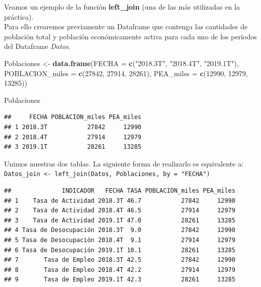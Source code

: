 \documentclass[]{book}
\newenvironment{Shaded}{\begin{snugshade}}{\end{snugshade}}
\newcommand{\DataTypeTok}[1]{\textcolor[rgb]{0.13,0.29,0.53}{#1}}
\newcommand{\DecValTok}[1]{\textcolor[rgb]{0.00,0.00,0.81}{#1}}
\newcommand{\KeywordTok}[1]{\textcolor[rgb]{0.13,0.29,0.53}{\textbf{#1}}}
\newcommand{\NormalTok}[1]{#1}
\newcommand{\OperatorTok}[1]{\textcolor[rgb]{0.81,0.36,0.00}{\textbf{#1}}}
\newcommand{\StringTok}[1]{\textcolor[rgb]{0.31,0.60,0.02}{#1}}
\begin{document}
Veamos un ejemplo de la función \textbf{left\_join} (una de las más utilizadas en la práctica).\\
Para ello crearemos previamente un Dataframe que contenga las cantidades de población total y población económicamente activa para cada uno de los períodos del Dataframe \emph{Datos}.

\begin{Shaded}
\begin{Highlighting}[]
\NormalTok{Poblaciones <-}\StringTok{ }\KeywordTok{data.frame}\NormalTok{(}\DataTypeTok{FECHA =} \KeywordTok{c}\NormalTok{(}\StringTok{"2018.3T"}\NormalTok{, }\StringTok{"2018.4T"}\NormalTok{, }\StringTok{"2019.1T"}\NormalTok{),}
                          \DataTypeTok{POBLACION_miles =} \KeywordTok{c}\NormalTok{(}\DecValTok{27842}\NormalTok{, }\DecValTok{27914}\NormalTok{, }\DecValTok{28261}\NormalTok{),}
                          \DataTypeTok{PEA_miles =} \KeywordTok{c}\NormalTok{(}\DecValTok{12990}\NormalTok{, }\DecValTok{12979}\NormalTok{, }\DecValTok{13285}\NormalTok{))}

\NormalTok{Poblaciones}
\end{Highlighting}
\end{Shaded}

\begin{verbatim}
##     FECHA POBLACION_miles PEA_miles
## 1 2018.3T           27842     12990
## 2 2018.4T           27914     12979
## 3 2019.1T           28261     13285
\end{verbatim}

Unimos nuestras dos tablas. La siguiente forma de realizarlo es equivalente a:\\
\texttt{Datos\_join\ \textless{}-\ left\_join(Datos,\ Poblaciones,\ by\ =\ "FECHA")}

\begin{Shaded}
\end{Shaded}

\begin{verbatim}
##              INDICADOR   FECHA TASA POBLACION_miles PEA_miles
## 1    Tasa de Actividad 2018.3T 46.7           27842     12990
## 2    Tasa de Actividad 2018.4T 46.5           27914     12979
## 3    Tasa de Actividad 2019.1T 47.0           28261     13285
## 4 Tasa de Desocupación 2018.3T  9.0           27842     12990
## 5 Tasa de Desocupación 2018.4T  9.1           27914     12979
## 6 Tasa de Desocupación 2019.1T 10.1           28261     13285
## 7       Tasa de Empleo 2018.3T 42.5           27842     12990
## 8       Tasa de Empleo 2018.4T 42.2           27914     12979
## 9       Tasa de Empleo 2019.1T 42.3           28261     13285
\end{verbatim}
\end{document}

